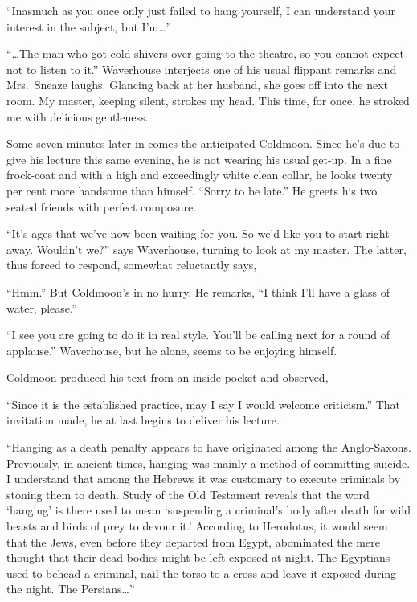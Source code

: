 \documentclass[12pt, openright]{book}
\begin{document}
``Inasmuch as you once only just failed to hang yourself, I can
understand your interest in the subject, but I'm\ldots{}''

``\ldots{}The man who got cold shivers over going to the theatre, so you
cannot expect not to listen to it.'' Waverhouse interjects one of his
usual flippant remarks and Mrs.~Sneaze laughs. Glancing back at her
husband, she goes off into the next room. My master, keeping silent,
strokes my head. This time, for once, he stroked me with delicious
gentleness.

Some seven minutes later in comes the anticipated Coldmoon. Since he's
due to give his lecture this same evening, he is not wearing his usual
get-up. In a fine frock-coat and with a high and exceedingly white clean
collar, he looks twenty per cent more handsome than himself. ``Sorry to
be late.'' He greets his two seated friends with perfect composure.

``It's ages that we've now been waiting for you. So we'd like you to
start right away. Wouldn't we?'' says Waverhouse, turning to look at my
master. The latter, thus forced to respond, somewhat reluctantly says,

``Hmm.'' But Coldmoon's in no hurry. He remarks, ``I think I'll have a
glass of water, please.''

``I see you are going to do it in real style. You'll be calling next for
a round of applause.'' Waverhouse, but he alone, seems to be enjoying
himself.

Coldmoon produced his text from an inside pocket and observed,

``Since it is the established practice, may I say I would welcome
criticism.'' That invitation made, he at last begins to deliver his
lecture.

``Hanging as a death penalty appears to have originated among the
Anglo-Saxons. Previously, in ancient times, hanging was mainly a method
of committing suicide. I understand that among the Hebrews it was
customary to execute criminals by stoning them to death. Study of the
Old Testament reveals that the word `hanging' is there used to mean
`suspending a criminal's body after death for wild beasts and birds of
prey to devour it.' According to Herodotus, it would seem that the Jews,
even before they departed from Egypt, abominated the mere thought that
their dead bodies might be left exposed at night. The Egyptians used to
behead a criminal, nail the torso to a cross and leave it exposed during
the night. The Persians\ldots{}''
\end{document}
